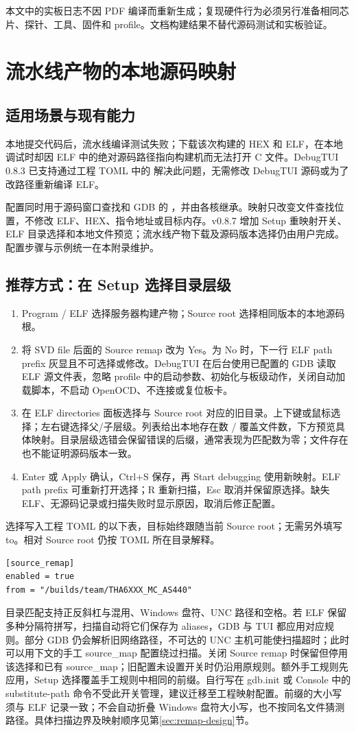 \documentclass[UTF8,a4paper,11pt,oneside,fontset=none]{ctexart}
\newcommand{\code}[1]{\texttt{\detokenize{#1}}}
\newcommand{\newsection}[1]{\par\Needspace{10\baselineskip}\section{#1}}
\begin{document}
本文中的实板日志不因 PDF 编译而重新生成；复现硬件行为必须另行准备相同芯片、探针、工具、固件和 profile。文档构建结果不替代源码测试和实板验证。

\newsection{流水线产物的本地源码映射}\label{sec:ci-source}
\subsection{适用场景与现有能力}
本地提交代码后，流水线编译测试失败；下载该次构建的 HEX 和 ELF，在本地调试时却因 ELF 中的绝对源码路径指向构建机而无法打开 C 文件。DebugTUI 0.8.3 已支持通过工程 TOML 中的 \code{[[source_map]]} 解决此问题，无需修改 DebugTUI 源码或为了改路径重新编译 ELF。

配置同时用于源码窗口查找和 GDB 的 \code{set substitute-path}，并由各核继承。映射只改变文件查找位置，不修改 ELF、HEX、指令地址或目标内存。v0.8.7 增加 Setup 重映射开关、ELF 目录选择和本地文件预览；流水线产物下载及源码版本选择仍由用户完成。配置步骤与示例统一在本附录维护。

\subsection{推荐方式：在 Setup 选择目录层级}
\begin{enumerate}
\item Program / ELF 选择服务器构建产物；Source root 选择相同版本的本地源码根。
\item 将 SVD file 后面的 Source remap 改为 Yes。为 No 时，下一行 ELF path prefix 灰显且不可选择或修改。DebugTUI 在后台使用已配置的 GDB 读取 ELF 源文件表，忽略 profile 中的启动参数、初始化与板级动作，关闭自动加载脚本，不启动 OpenOCD、不连接或复位板卡。
\item 在 ELF directories 面板选择与 Source root 对应的旧目录。上下键或鼠标选择；左右键选择父/子层级。列表给出本地存在数 / 覆盖文件数，下方预览具体映射。目录层级选错会保留错误的后缀，通常表现为匹配数为零；文件存在也不能证明源码版本一致。
\item Enter 或 Apply 确认，Ctrl+S 保存，再 Start debugging 使用新映射。ELF path prefix 可重新打开选择；R 重新扫描，Esc 取消并保留原选择。缺失 ELF、无源码记录或扫描失败时显示原因，取消后修正配置。
\end{enumerate}
选择写入工程 TOML 的以下表，目标始终跟随当前 Source root；无需另外填写 to。相对 Source root 仍按 TOML 所在目录解释。
\begin{lstlisting}
[source_remap]
enabled = true
from = "/builds/team/THA6XXX_MC_AS440"
\end{lstlisting}
目录匹配支持正反斜杠与混用、Windows 盘符、UNC 路径和空格。若 ELF 保留多种分隔符拼写，扫描自动将它们保存为 aliases，GDB 与 TUI 都应用对应规则。部分 GDB 仍会解析旧网络路径，不可达的 UNC 主机可能使扫描超时；此时可以用下文的手工 source\_map 配置绕过扫描。关闭 Source remap 时保留但停用该选择和已有 source\_map；旧配置未设置开关时仍沿用原规则。额外手工规则先应用，Setup 选择覆盖手工规则中相同的前缀。自行写在 gdb.init 或 Console 中的 substitute-path 命令不受此开关管理，建议迁移至工程映射配置。前缀的大小写须与 ELF 记录一致；不会自动折叠 Windows 盘符大小写，也不按同名文件猜测路径。具体扫描边界及映射顺序见第\ref{sec:remap-design}节。
\end{document}
